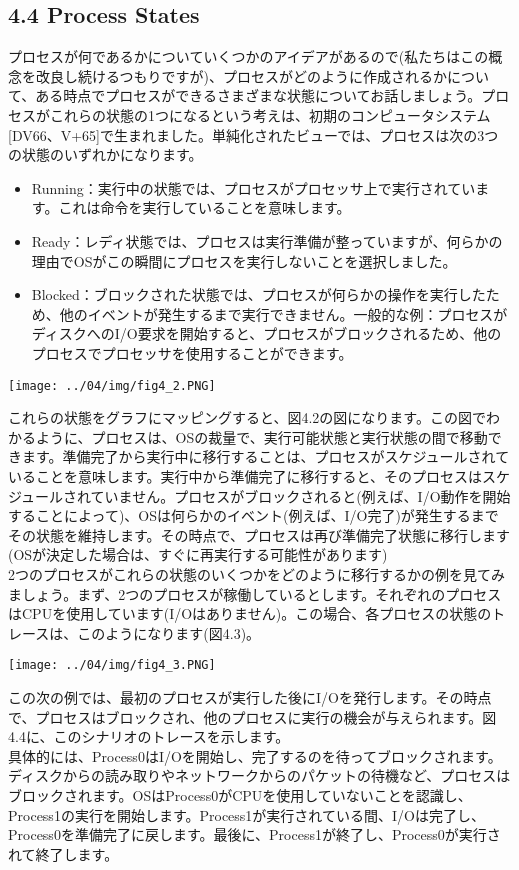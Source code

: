 \hypertarget{process-states}{%
\subsection*{4.4 Process States}\label{process-states}}

プロセスが何であるかについていくつかのアイデアがあるので(私たちはこの概念を改良し続けるつもりですが)、プロセスがどのように作成されるかについて、ある時点でプロセスができるさまざまな状態についてお話しましょう。プロセスがこれらの状態の1つになるという考えは、初期のコンピュータシステム{[}DV66、V+65{]}で生まれました。単純化されたビューでは、プロセスは次の3つの状態のいずれかになります。

\begin{itemize}
\item
  Running：実行中の状態では、プロセスがプロセッサ上で実行されています。これは命令を実行していることを意味します。
\item
  Ready：レディ状態では、プロセスは実行準備が整っていますが、何らかの理由でOSがこの瞬間にプロセスを実行しないことを選択しました。
\item
  Blocked：ブロックされた状態では、プロセスが何らかの操作を実行したため、他のイベントが発生するまで実行できません。一般的な例：プロセスがディスクへのI/O要求を開始すると、プロセスがブロックされるため、他のプロセスでプロセッサを使用することができます。
\end{itemize}

\texttt{[image: ../04/img/fig4\_2.PNG]}

これらの状態をグラフにマッピングすると、図4.2の図になります。この図でわかるように、プロセスは、OSの裁量で、実行可能状態と実行状態の間で移動できます。準備完了から実行中に移行することは、プロセスがスケジュールされていることを意味します。実行中から準備完了に移行すると、そのプロセスはスケジュールされていません。プロセスがブロックされると(例えば、I/O動作を開始することによって)、OSは何らかのイベント(例えば、I/O完了)が発生するまでその状態を維持します。その時点で、プロセスは再び準備完了状態に移行します(OSが決定した場合は、すぐに再実行する可能性があります)\\
2つのプロセスがこれらの状態のいくつかをどのように移行するかの例を見てみましょう。まず、2つのプロセスが稼働しているとします。それぞれのプロセスはCPUを使用しています(I/Oはありません)。この場合、各プロセスの状態のトレースは、このようになります(図4.3)。

\texttt{[image: ../04/img/fig4\_3.PNG]}

この次の例では、最初のプロセスが実行した後にI/Oを発行します。その時点で、プロセスはブロックされ、他のプロセスに実行の機会が与えられます。図4.4に、このシナリオのトレースを示します。\\
具体的には、Process0はI/Oを開始し、完了するのを待ってブロックされます。ディスクからの読み取りやネットワークからのパケットの待機など、プロセスはブロックされます。OSはProcess0がCPUを使用していないことを認識し、Process1の実行を開始します。Process1が実行されている間、I/Oは完了し、Process0を準備完了に戻します。最後に、Process1が終了し、Process0が実行されて終了します。

